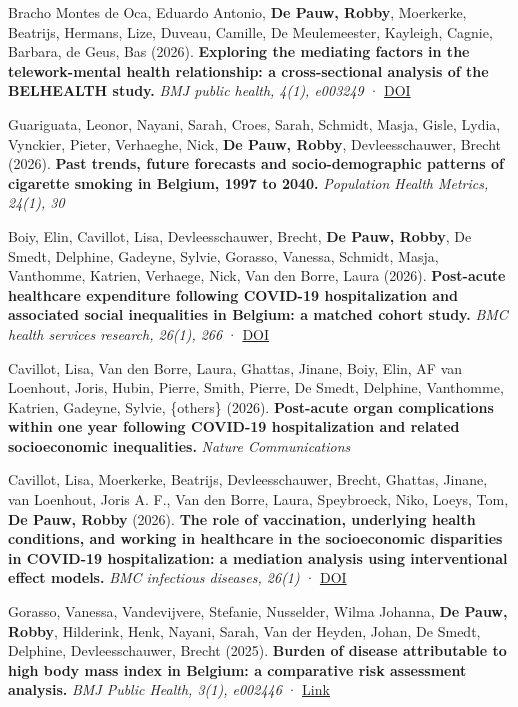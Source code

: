 \documentclass[
  letterpaper,
  DIV=11,
  numbers=noendperiod]{scrartcl}
\begin{document}
Bracho Montes de Oca, Eduardo Antonio, \textbf{De Pauw, Robby},
Moerkerke, Beatrijs, Hermans, Lize, Duveau, Camille, De Meulemeester,
Kayleigh, Cagnie, Barbara, de Geus, Bas (2026). \textbf{Exploring the
mediating factors in the telework-mental health relationship: a
cross-sectional analysis of the BELHEALTH study.} \emph{BMJ public
health, 4(1), e003249} ·
\href{https://doi.org/10.1136/bmjph-2025-003249}{DOI}

Guariguata, Leonor, Nayani, Sarah, Croes, Sarah, Schmidt, Masja, Gisle,
Lydia, Vynckier, Pieter, Verhaeghe, Nick, \textbf{De Pauw, Robby},
Devleesschauwer, Brecht (2026). \textbf{Past trends, future forecasts
and socio-demographic patterns of cigarette smoking in Belgium, 1997 to
2040.} \emph{Population Health Metrics, 24(1), 30}

Boiy, Elin, Cavillot, Lisa, Devleesschauwer, Brecht, \textbf{De Pauw,
Robby}, De Smedt, Delphine, Gadeyne, Sylvie, Gorasso, Vanessa, Schmidt,
Masja, Vanthomme, Katrien, Verhaege, Nick, Van den Borre, Laura (2026).
\textbf{Post-acute healthcare expenditure following COVID-19
hospitalization and associated social inequalities in Belgium: a matched
cohort study.} \emph{BMC health services research, 26(1), 266} ·
\href{https://doi.org/10.1186/s12913-025-13949-2}{DOI}

Cavillot, Lisa, Van den Borre, Laura, Ghattas, Jinane, Boiy, Elin, AF
van Loenhout, Joris, Hubin, Pierre, Smith, Pierre, De Smedt, Delphine,
Vanthomme, Katrien, Gadeyne, Sylvie, \{others\} (2026).
\textbf{Post-acute organ complications within one year following
COVID-19 hospitalization and related socioeconomic inequalities.}
\emph{Nature Communications}

Cavillot, Lisa, Moerkerke, Beatrijs, Devleesschauwer, Brecht, Ghattas,
Jinane, van Loenhout, Joris A. F., Van den Borre, Laura, Speybroeck,
Niko, Loeys, Tom, \textbf{De Pauw, Robby} (2026). \textbf{The role of
vaccination, underlying health conditions, and working in healthcare in
the socioeconomic disparities in COVID-19 hospitalization: a mediation
analysis using interventional effect models.} \emph{BMC infectious
diseases, 26(1)} ·
\href{https://doi.org/10.1186/s12879-026-12907-5}{DOI}

Gorasso, Vanessa, Vandevijvere, Stefanie, Nusselder, Wilma Johanna,
\textbf{De Pauw, Robby}, Hilderink, Henk, Nayani, Sarah, Van der Heyden,
Johan, De Smedt, Delphine, Devleesschauwer, Brecht (2025).
\textbf{Burden of disease attributable to high body mass index in
Belgium: a comparative risk assessment analysis.} \emph{BMJ Public
Health, 3(1), e002446} ·
\href{http://dx.doi.org/10.1136/BMJPH-2024-002446}{Link}
\end{document}

